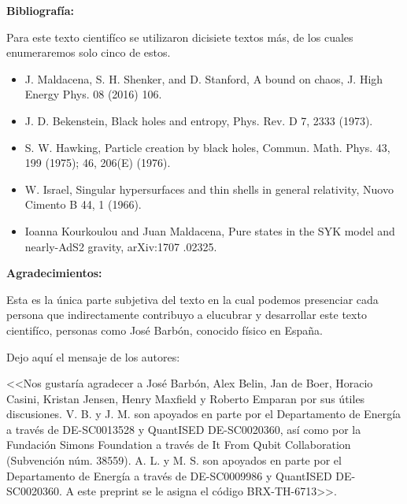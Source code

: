 \documentclass[letterpaper]{article}
\begin{document}
\begin{justify}
\textbf{Bibliografía:}
\end{justify}
\begin{justify}
Para este texto cientifíco se utilizaron dicisiete textos más, de los cuales enumeraremos solo cinco de estos.
\end{justify}
\begin{justify}
\begin{itemize}
    \item J. Maldacena, S. H. Shenker, and D. Stanford, A bound on
    chaos, J. High Energy Phys. 08 (2016) 106.
    \item  J. D. Bekenstein, Black holes and entropy, Phys. Rev. D 7,
    2333 (1973).
    \item S. W. Hawking, Particle creation by black holes, Commun.
    Math. Phys. 43, 199 (1975); 46, 206(E) (1976).
    \item W. Israel, Singular hypersurfaces and thin shells in general
    relativity, Nuovo Cimento B 44, 1 (1966).
    \item Ioanna Kourkoulou and Juan Maldacena, Pure states in
    the SYK model and nearly-AdS2 gravity, arXiv:1707
    .02325.
\end{itemize}
\vspace{\baselineskip}

\end{justify}
\begin{justify}
\textbf{Agradecimientos:}
\end{justify}
\begin{justify}
Esta es la única parte subjetiva del texto en la cual podemos presenciar cada persona que indirectamente contribuyo a elucubrar y desarrollar este texto cientifíco,
personas como José Barbón, conocido físico en España.
\end{justify}
\begin{justify}
Dejo aquí el mensaje de los autores:
\end{justify}
\begin{justify}

<<Nos gustaría agradecer a José Barbón, Alex Belin, Jan de Boer, Horacio Casini, Kristan Jensen, Henry Maxfield y Roberto Emparan por sus útiles discusiones. V. B. y J. M. son apoyados en parte por el Departamento de Energía a través de DE-SC0013528 y QuantISED DE-SC0020360, así como por la Fundación Simons
Foundation a través de It From Qubit Collaboration (Subvención núm. 38559). A. L. y M. S. son apoyados en parte por el Departamento de Energía a través de DE-SC0009986 y QuantISED DE-SC0020360. A este preprint se le asigna el código BRX-TH-6713>>.





\end{justify}
\end{document}
